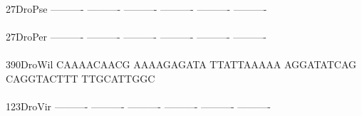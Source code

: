 \documentclass[11pt,twoside,reqno,a4paper]{article}
\begin{document}
{27\hspace*{3\charwidth}DroPse	----------	----------	----------	----------	----------	----------	\\
\hspace*{5\charwidth}\hspace*{7\charwidth}\hspace*{1\charwidth}\hspace*{1\charwidth}\hspace*{1\charwidth}\hspace*{1\charwidth}\hspace*{1\charwidth}\hspace*{1\charwidth}\\
27\hspace*{3\charwidth}DroPer	----------	----------	----------	----------	----------	----------	\\
\hspace*{5\charwidth}\hspace*{7\charwidth}\hspace*{1\charwidth}\hspace*{1\charwidth}\hspace*{1\charwidth}\hspace*{1\charwidth}\hspace*{1\charwidth}\hspace*{1\charwidth}\\
390\hspace*{2\charwidth}DroWil	CAAAACAACG	AAAAGAGATA	TTATTAAAAA	AGGATATCAG	CAGGTACTTT	TTGCATTGGC	\\
\hspace*{5\charwidth}\hspace*{7\charwidth}\hspace*{1\charwidth}\hspace*{1\charwidth}\hspace*{1\charwidth}\hspace*{1\charwidth}\hspace*{1\charwidth}\hspace*{1\charwidth}\\
123\hspace*{2\charwidth}DroVir	----------	----------	----------	----------	----------	----------	\\
\hspace*{5\charwidth}\hspace*{7\charwidth}\hspace*{1\charwidth}\hspace*{1\charwidth}\hspace*{1\charwidth}\hspace*{1\charwidth}\hspace*{1\charwidth}\hspace*{1\charwidth}\\
}
\end{document}
